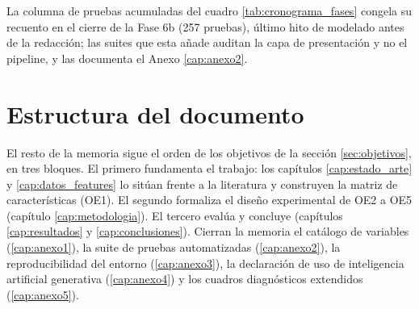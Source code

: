 \begin{sloppypar}
La columna de pruebas acumuladas del cuadro \ref{tab:cronograma_fases} congela su
recuento en el cierre de la Fase 6b (257 pruebas), último hito de modelado antes de la
redacción; las suites que esta añade auditan la capa de presentación y no el pipeline, y
las documenta el Anexo \ref{cap:anexo2}.
\end{sloppypar}

\section{Estructura del documento}\label{sec:estructura_documento}

El resto de la memoria sigue el orden de los objetivos de la sección \ref{sec:objetivos},
en tres bloques. El primero fundamenta el trabajo: los capítulos \ref{cap:estado_arte} y
\ref{cap:datos_features} lo sitúan frente a la literatura y construyen la matriz de
características (OE1). El segundo formaliza el diseño experimental de OE2 a OE5 (capítulo
\ref{cap:metodologia}). El tercero evalúa y concluye (capítulos \ref{cap:resultados} y
\ref{cap:conclusiones}). Cierran la memoria el catálogo de variables (\ref{cap:anexo1}),
la suite de pruebas automatizadas (\ref{cap:anexo2}), la reproducibilidad del entorno
(\ref{cap:anexo3}), la declaración de uso de inteligencia artificial generativa
(\ref{cap:anexo4}) y los cuadros diagnósticos extendidos (\ref{cap:anexo5}).
